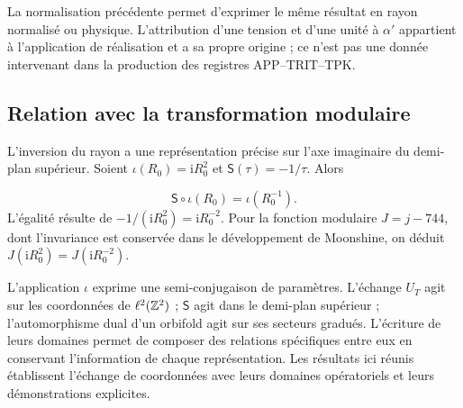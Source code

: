 La normalisation précédente permet d’exprimer le même résultat en
rayon normalisé ou physique. L’attribution d’une tension et d’une
unité à \(\alpha'\) appartient à l’application de réalisation et a
sa propre origine ; ce n’est pas une donnée intervenant dans la production
des registres APP--TRIT--TPK.

\subsection{Relation avec la transformation modulaire
}

L’inversion du rayon a une représentation précise sur
l’axe imaginaire du demi-plan supérieur. Soient
\(\iota(R_0)=\mathrm iR_0^2\) et
\(\mathsf S(\tau)=-1/\tau\). Alors

\begin{equation}
 \mathsf S\circ\iota(R_0)=\iota(R_0^{-1}).
 \label{iv:eq:semiconjugacion-modular}
\end{equation}
L’égalité résulte de
\(-1/(\mathrm iR_0^2)=\mathrm iR_0^{-2}\). Pour la fonction
modulaire \(J=j-744\), dont l’invariance est conservée dans le
développement de Moonshine, on déduit
\(J(\mathrm iR_0^2)=J(\mathrm iR_0^{-2})\).

L’application \(\iota\) exprime une semi-conjugaison de paramètres.
L’échange \(U_T\) agit sur les coordonnées de
\(\ell^2(\mathbb Z^2)\) ; \(\mathsf S\) agit dans le demi-plan
supérieur ; l’automorphisme dual d’un orbifold agit sur ses
secteurs gradués. L’écriture de leurs domaines permet de
composer des relations spécifiques entre eux en conservant
l’information de chaque représentation. Les résultats ici
réunis établissent l’échange de coordonnées avec leurs
domaines opératoriels et leurs démonstrations explicites.

